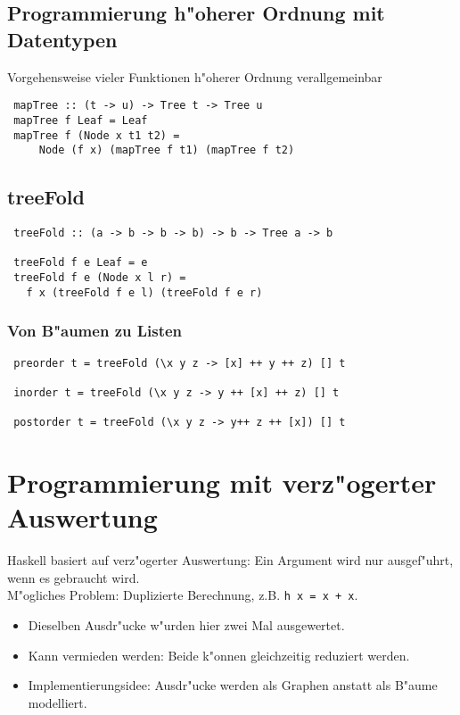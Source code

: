 \documentclass[german,10pt, a4paper, twocolumn]{scrartcl}
\theoremstyle{definition}
\theoremstyle{remark}
\begin{document}
\subsection{Programmierung h"oherer Ordnung mit Datentypen}

Vorgehensweise vieler Funktionen h"oherer Ordnung verallgemeinbar
\small
\begin{verbatim}
 mapTree :: (t -> u) -> Tree t -> Tree u
 mapTree f Leaf = Leaf
 mapTree f (Node x t1 t2) =
     Node (f x) (mapTree f t1) (mapTree f t2)
\end{verbatim}
\normalsize

\subsection{treeFold}

\small
\begin{verbatim}
 treeFold :: (a -> b -> b -> b) -> b -> Tree a -> b

 treeFold f e Leaf = e
 treeFold f e (Node x l r) =
   f x (treeFold f e l) (treeFold f e r)
\end{verbatim}
\normalsize

\subsubsection{Von B"aumen zu Listen}

\small
\begin{verbatim}
 preorder t = treeFold (\x y z -> [x] ++ y ++ z) [] t
 
 inorder t = treeFold (\x y z -> y ++ [x] ++ z) [] t

 postorder t = treeFold (\x y z -> y++ z ++ [x]) [] t
\end{verbatim}
\normalsize

\section{Programmierung mit verz"ogerter Auswertung}

Haskell basiert auf verz"ogerter Auswertung: Ein Argument wird nur ausgef"uhrt, wenn es gebraucht wird.\\

M"ogliches Problem: Duplizierte Berechnung, z.B. \verb#h x = x + x#.
\begin{itemize}
	\item Dieselben Ausdr"ucke w"urden hier zwei Mal ausgewertet.
	\item Kann vermieden werden: Beide k"onnen gleichzeitig reduziert werden.
	\item Implementierungsidee: Ausdr"ucke werden als Graphen anstatt als B"aume modelliert.
\end{itemize}
\end{document}

